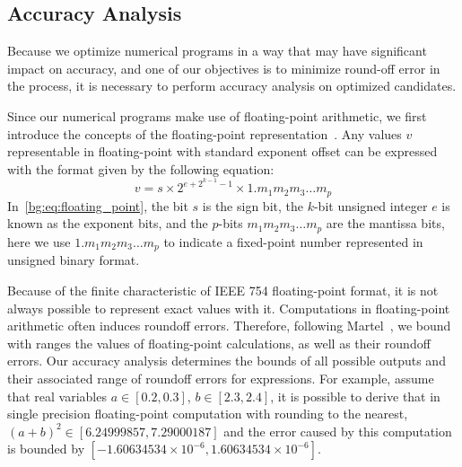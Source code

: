 \subsection{Accuracy Analysis}
\label{bg:sub:accuracy}

Because we optimize numerical programs in a way that may have significant
impact on accuracy, and one of our objectives is to minimize round-off error
in the process, it is necessary to perform accuracy analysis on optimized
candidates.

Since our numerical programs make use of floating-point arithmetic, we first
introduce the concepts of the floating-point representation~\cite{ieee754}. Any
values $v$ representable in floating-point with standard exponent offset can be
expressed with the format given by the following equation:
\begin{equation}
    v = s \times 2^{e + 2^{k - 1} - 1} \times 1.{m_1 m_2 m_3 \ldots m_p}
    \label{bg:eq:floating_point}
\end{equation}
In~\eqref{bg:eq:floating_point}, the bit $s$ is the sign bit, the $k$-bit
unsigned integer $e$ is known as the exponent bits, and the $p$-bits $m_1 m_2
m_3 \ldots m_p$ are the mantissa bits, here we use $1.{m_1 m_2 m_3 \ldots m_p}$
to indicate a fixed-point number represented in unsigned binary format.

Because of the finite characteristic of IEEE 754 floating-point format, it
is not always possible to represent exact values with it. Computations in
floating-point arithmetic often induces roundoff errors. Therefore, following
Martel~\cite{martel07}, we bound with ranges the values of floating-point
calculations, as well as their roundoff errors. Our accuracy analysis
determines the bounds of all possible outputs and their associated range of
roundoff errors for expressions. For example, assume that real variables $a
\in [0.2, 0.3]$, $b \in [2.3, 2.4]$, it is possible to derive that in single
precision floating-point computation with rounding to the nearest, ${(a + b)}^2
\in [6.24999857, 7.29000187]$ and the error caused by this computation is
bounded by $[-1.60634534\times10^{-6}, 1.60634534\times10^{-6}]$.

